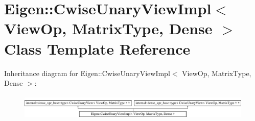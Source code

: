 \hypertarget{class_eigen_1_1_cwise_unary_view_impl_3_01_view_op_00_01_matrix_type_00_01_dense_01_4}{}\section{Eigen\+:\+:Cwise\+Unary\+View\+Impl$<$ View\+Op, Matrix\+Type, Dense $>$ Class Template Reference}
\label{class_eigen_1_1_cwise_unary_view_impl_3_01_view_op_00_01_matrix_type_00_01_dense_01_4}
Inheritance diagram for Eigen\+:\+:Cwise\+Unary\+View\+Impl$<$ View\+Op, Matrix\+Type, Dense $>$\+:\begin{figure}[H]
\begin{center}
\leavevmode
\includegraphics[height=1.238938cm]{class_eigen_1_1_cwise_unary_view_impl_3_01_view_op_00_01_matrix_type_00_01_dense_01_4}
\end{center}
\end{figure}
